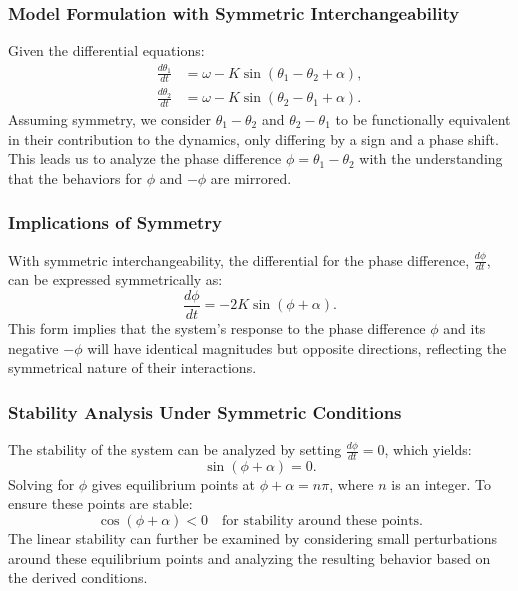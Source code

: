 \documentclass[12pt,a4paper]{article}
\begin{document}
\subsubsection{Model Formulation with Symmetric Interchangeability}
Given the differential equations:
\begin{align}
    \frac{d\theta_1}{dt} &= \omega - K \sin(\theta_1 - \theta_2 + \alpha), \\
    \frac{d\theta_2}{dt} &= \omega - K \sin(\theta_2 - \theta_1 + \alpha).
\end{align}
Assuming symmetry, we consider \(\theta_1 - \theta_2\) and \(\theta_2 - \theta_1\) to be functionally equivalent in their contribution to the dynamics, only differing by a sign and a phase shift. This leads us to analyze the phase difference \(\phi = \theta_1 - \theta_2\) with the understanding that the behaviors for \(\phi\) and \(-\phi\) are mirrored.

\subsubsection{Implications of Symmetry}
With symmetric interchangeability, the differential for the phase difference, \(\frac{d\phi}{dt}\), can be expressed symmetrically as:
\[
\frac{d\phi}{dt} = -2K \sin(\phi + \alpha).
\]
This form implies that the system's response to the phase difference \(\phi\) and its negative \(-\phi\) will have identical magnitudes but opposite directions, reflecting the symmetrical nature of their interactions.

\subsubsection{Stability Analysis Under Symmetric Conditions}
The stability of the system can be analyzed by setting \(\frac{d\phi}{dt} = 0\), which yields:
\[
\sin(\phi + \alpha) = 0.
\]
Solving for \(\phi\) gives equilibrium points at \(\phi + \alpha = n\pi\), where \(n\) is an integer. To ensure these points are stable:
\[
\cos(\phi + \alpha) < 0 \quad \text{for stability around these points.}
\]
The linear stability can further be examined by considering small perturbations around these equilibrium points and analyzing the resulting behavior based on the derived conditions.
\end{document}
